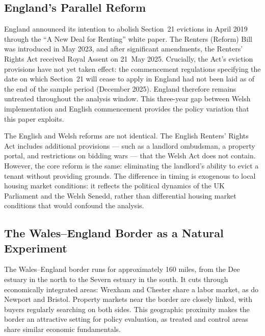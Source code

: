 \documentclass[12pt]{article}
\begin{document}
\subsection{England's Parallel Reform}

England announced its intention to abolish Section~21 evictions in April 2019 through the ``A New Deal for Renting'' white paper. The Renters (Reform) Bill was introduced in May 2023, and after significant amendments, the Renters' Rights Act received Royal Assent on 21~May 2025. Crucially, the Act's eviction provisions have not yet taken effect: the commencement regulations specifying the date on which Section~21 will cease to apply in England had not been laid as of the end of the sample period (December 2025). England therefore remains untreated throughout the analysis window. This three-year gap between Welsh implementation and English commencement provides the policy variation that this paper exploits.

The English and Welsh reforms are not identical. The English Renters' Rights Act includes additional provisions --- such as a landlord ombudsman, a property portal, and restrictions on bidding wars --- that the Welsh Act does not contain. However, the core reform is the same: eliminating the landlord's ability to evict a tenant without providing grounds. The difference in timing is exogenous to local housing market conditions: it reflects the political dynamics of the UK Parliament and the Welsh Senedd, rather than differential housing market conditions that would confound the analysis.

\subsection{The Wales--England Border as a Natural Experiment}

The Wales--England border runs for approximately 160 miles, from the Dee estuary in the north to the Severn estuary in the south. It cuts through economically integrated areas: Wrexham and Chester share a labor market, as do Newport and Bristol. Property markets near the border are closely linked, with buyers regularly searching on both sides. This geographic proximity makes the border an attractive setting for policy evaluation, as treated and control areas share similar economic fundamentals.
\end{document}
